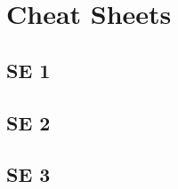 \part{Cheat Sheets}


\chapter{SE 1}

\clearpage


\chapter{SE 2}

\clearpage


\chapter{SE 3}

\clearpage



\clearpage


\clearpage


\clearpage


\clearpage


\clearpage